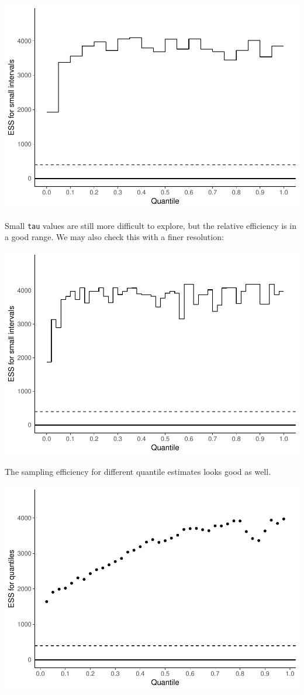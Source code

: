 \documentclass[american,]{article}
\begin{document}
\includegraphics{graphics/local-ess-fit-ncp2-1.pdf}

Small \texttt{tau} values are still more difficult to explore, but the
relative efficiency is in a good range. We may also check this with a
finer resolution:

\includegraphics{graphics/local-ess-fit-ncp2-finer-1.pdf}

The sampling efficiency for different quantile estimates looks good as
well.

\includegraphics{graphics/quantile-ess-fit-ncp2-1.pdf}
\end{document}
